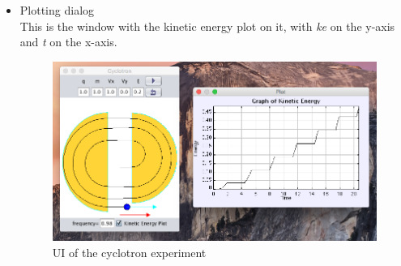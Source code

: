 \documentclass[11pt]{article}
\begin{document}
\begin{itemize}
\item Plotting dialog\\
\label{sec-1-3-6-4}%
This is the window with the kinetic energy plot on it, with \emph{ke} on
the y-axis and \emph{t} on the x-axis.
\begin{figure}[htb]
\centering
\includegraphics[width=.9\linewidth]{./cycloUI.png}
\caption{UI of the cyclotron experiment}
\end{figure}
\end{itemize} %
\end{document}
